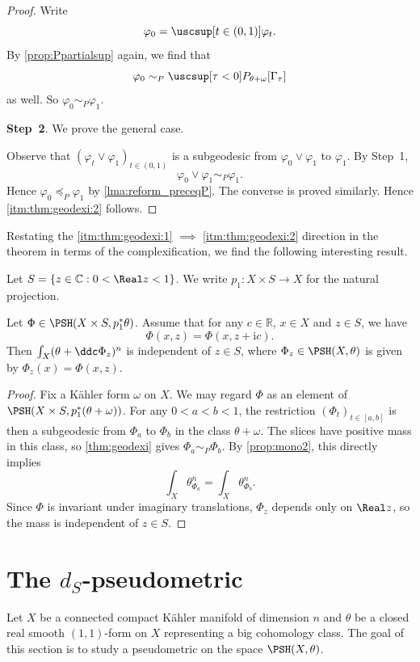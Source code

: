 \begin{proof}
    Write
    \[
    \varphi_0=\uscsup[t\in (0,1)]\varphi_t.
    \]
    By \cref{prop:Ppartialsup} again, we find that
    \[
    \varphi_0\sim_P \uscsup[\tau<0] P_{\theta+\omega}[\Gamma_{\tau}]
    \]
    as well. So $\varphi_0\sim_P \varphi_1$.


    \textbf{Step~2}. We prove the general case.

    Observe that $(\varphi_t\lor\varphi_1)_{t\in (0,1)}$ is a subgeodesic from $\varphi_0\lor \varphi_1$ to $\varphi_1$. By Step~1,
    \[
    \varphi_0\lor \varphi_1\sim_P \varphi_1.
    \]
    Hence $\varphi_0\preceq_P \varphi_1$ by \cref{lma:reform_preceqP}. The converse is proved similarly. Hence \ref{itm:thm:geodexi:2} follows.

\end{proof}

Restating the \ref{itm:thm:geodexi:1} $\implies$ \ref{itm:thm:geodexi:2} direction in the theorem in terms of the complexification, we find the following interesting result.

Let $S=\{z\in \mathbb{C}:0< \Real z <1\}$. We write $p_1\colon X\times S\rightarrow X$ for the natural projection.
\begin{corollary}\label{cor:comp:L653}
    Let $\Phi\in \PSH(X\times S,p_1^*\theta)$. Assume that for any $c\in \mathbb{R}$, $x\in X$ and $z\in S$, we have
    \[
    \Phi(x,z)=\Phi(x,z+\mathrm{i}c).
    \]
    Then $\int_X (\theta+\ddc \Phi_z)^n$ is independent of $z\in S$, where $\Phi_z \in \PSH(X,\theta)$ is given by $\Phi_z(x)=\Phi(x,z)$.
\end{corollary}

\begin{proof}
    Fix a Kähler form $\omega$ on $X$. We may regard $\Phi$ as an element of $\PSH(X\times S,p_1^*(\theta+\omega))$. For any $0<a<b<1$, the restriction $(\Phi_t)_{t\in [a,b]}$ is then a subgeodesic from $\Phi_a$ to $\Phi_b$ in the class $\theta+\omega$. The slices have positive mass in this class, so \cref{thm:geodexi} gives $\Phi_a\sim_P\Phi_b$. By \cref{prop:mono2}, this directly implies
    \[
        \int_X \theta_{\Phi_a}^n=\int_X \theta_{\Phi_b}^n.
    \]
    Since $\Phi$ is invariant under imaginary translations, $\Phi_z$ depends only on $\Real z$, so the mass is independent of $z\in S$.
\end{proof}

\section[The \texorpdfstring{$\lowercase{d}_S$}{dS}-pseudometric]{The \texorpdfstring{$d_S$}{dS}-pseudometric}\label{sec:dsdef}
Let $X$ be a connected compact Kähler manifold of dimension $n$ and $\theta$ be a closed real smooth $(1,1)$-form on $X$ representing a big cohomology class. The goal of this section is to study a pseudometric on the space $\PSH(X,\theta)$.


